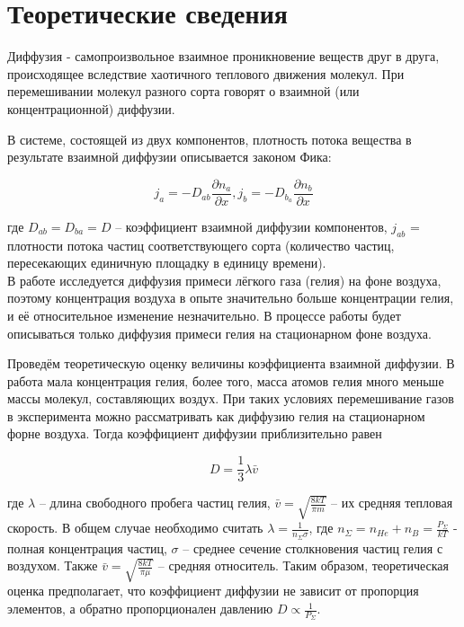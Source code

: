 \documentclass[a4paper,12pt]{article}
\begin{document}
\section{Теоретические сведения}


Диффузия - самопроизвольное взаимное проникновение веществ друг в друга, происходящее вследствие хаотичного теплового движения молекул. При перемешивании молекул разного сорта говорят о взаимной (или концентрационной) диффузии.

В системе, состоящей из двух компонентов, плотность потока вещества в результате взаимной диффузии описывается законом Фика:

\begin{equation}
    j_a = -D_{ab}\frac{\partial n_a}{\partial x}, j_b = -D_{b_a} \frac{\partial n_b}{\partial x}
\end{equation}

где $D_{ab} = D_{ba} = D$ -- коэффициент взаимной диффузии компонентов, $j_{ab}$ = плотности потока частиц соответствующего сорта (количество частиц, пересекающих единичную площадку в единицу времени).\\

В работе исследуется диффузия примеси лёгкого газа (гелия) на фоне воздуха, поэтому концентрация воздуха в опыте значительно больше концентрации гелия, и её относительное изменение незначительно. В процессе работы будет описываться только диффузия примеси гелия на стационарном фоне воздуха.

Проведём теоретическую оценку величины коэффициента взаимной диффузии. В работа мала концентрация гелия, более того, масса атомов гелия много меньше массы молекул, составляющих воздух. При таких условиях перемешивание газов в эксперимента можно рассматривать как диффузию гелия на стационарном форне воздуха. Тогда коэффициент диффузии приблизительно равен

\begin{equation}\label{eq:2}
    D = \frac{1}{3}\lambda \bar v
\end{equation}

где $\lambda$ -- длина свободного пробега частиц гелия, $\bar v = \sqrt{\frac{8kT}{\pi m}}$ -- их средняя тепловая скорость. В общем случае необходимо считать $\lambda = \frac{1}{n_\Sigma \sigma}$, где $n_\Sigma = n_{He} + n_B = \frac{P_\Sigma}{kT}$ - полная концентрация частиц, $\sigma$ -- среднее сечение столкновения частиц гелия с воздухом. Также  $\bar v = \sqrt{\frac{8kT}{\pi \mu}}$ -- средняя относитель. Таким образом, теоретическая оценка предполагает, что коэффициент диффузии не зависит от пропорция элементов, а обратно пропорционален давлению $D \propto \frac{1}{P_\Sigma}$. \\
\end{document}

